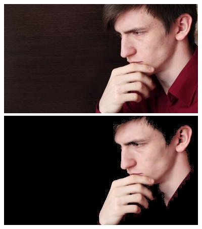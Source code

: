 \begin{center}
    \begin{figure}[!htb]
        \begin{minipage}{0.5\textwidth}
            \centering
            \includegraphics[scale=0.7]{images/unused_seg/28.jpg}
        \end{minipage}
        \begin{minipage}{0.5\textwidth}
            \centering
            \includegraphics[scale=0.7]{images/unused_seg/28m.jpg} 
        \end{minipage}
    \end{figure}
\end{center}


